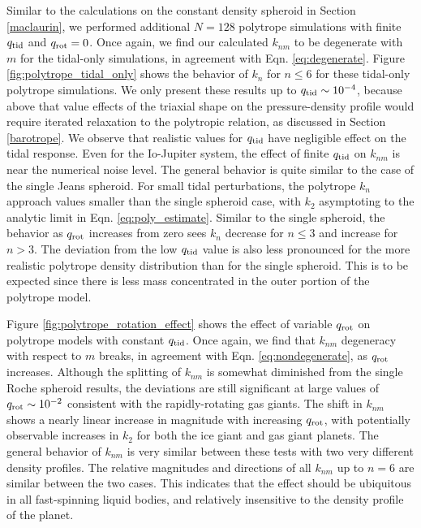 Similar to the calculations on the constant density spheroid in Section \ref{maclaurin}, we
performed additional $N=128$ polytrope simulations with finite $q_{\rm tid}$ and
$q_{\rm rot}=0$. Once again, we find our calculated $k_{nm}$ to be degenerate with
$m$ for the tidal-only simulations, in agreement with Eqn. \eqref{eq:degenerate}.
Figure \ref{fig:polytrope_tidal_only} shows the behavior of $k_n$ for $n\leq6$ for
these tidal-only polytrope simulations.  We only present these results up to $q_{\rm
tid}\sim10^{-4}$, because above that value effects of the triaxial shape on the
pressure-density profile would require iterated relaxation to the polytropic
relation, as discussed in Section \ref{barotrope}. We observe that realistic values
for $q_{\rm tid}$ have negligible effect on the tidal response. Even for the
Io-Jupiter system, the effect of finite $q_{\rm tid}$ on $k_{nm}$ is near the
numerical noise level. The general behavior is quite similar to the case of the
single Jeans spheroid.  For small tidal perturbations, the polytrope $k_n$
approach values smaller than the single spheroid case, with $k_2$ asymptoting to
the analytic limit in Eqn.  \eqref{eq:poly_estimate}.  Similar to the single  
spheroid, the behavior as $q_{\rm rot}$ increases from zero sees $k_n$ decrease for
$n\leq3$ and increase for $n>3$.  The deviation from the low $q_{\rm tid}$ value is
also less pronounced for the more realistic polytrope density distribution than for
the single spheroid. This is to be expected since there is less mass concentrated
in the outer portion of the polytrope model. 

Figure \ref{fig:polytrope_rotation_effect} shows the effect of variable $q_{\rm rot}$
on polytrope models with constant $q_{\rm tid}$. Once again, we find that $k_{nm}$
degeneracy with respect to $m$ breaks, in agreement with Eqn.
\eqref{eq:nondegenerate}, as $q_{\rm rot}$ increases. Although the splitting of
$k_{nm}$ is somewhat diminished from the single Roche spheroid results, the
deviations are still significant at large values of $q_{\rm rot}\sim 10^{-2}$
consistent with the rapidly-rotating gas giants. The shift in $k_{nm}$ shows a nearly
linear increase in magnitude with increasing $q_{\rm rot}$, with potentially
observable increases in $k_2$ for both the ice giant and gas giant planets. The
general behavior of $k_{nm}$ is very similar between these tests with two very
different density profiles. The relative magnitudes and directions of all $k_{nm}$ up
to $n=6$ are similar between the two cases. This indicates that the effect should be
ubiquitous in all fast-spinning liquid bodies, and relatively insensitive to the
density profile of the planet.

